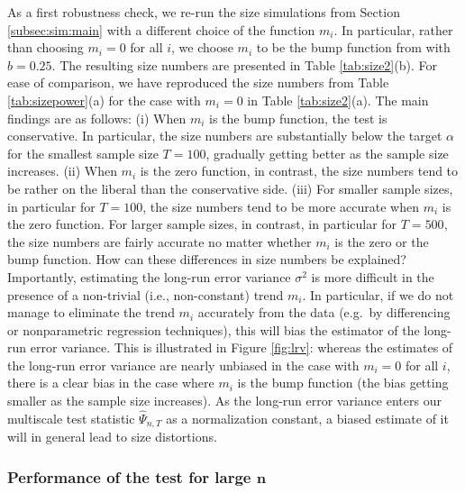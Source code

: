 \documentclass[12pt]{article}
\makeatletter
\renewcommand{\eqref}[1]{\tagform@{\ref{#1}}}
\makeatother
\begin{document}
As a first robustness check, we re-run the size simulations from Section \ref{subsec:sim:main}  with a different choice of the function $m_i$. In particular, rather than choosing $m_i = 0$ for all $i$, we choose $m_i$ to be the bump function from \eqref{eq:bump-fct} with $b=0.25$. The resulting size numbers are presented in Table \ref{tab:size2}(b). For ease of comparison, we have reproduced the size numbers from Table \ref{tab:sizepower}(a) for the case with $m_i=0$ in Table \ref{tab:size2}(a). The main findings are as follows: (i) When $m_i$ is the bump function, the test is conservative. In particular, the size numbers are substantially below the target $\alpha$ for the smallest sample size $T=100$, gradually getting better as the sample size increases. (ii) When $m_i$ is the zero function, in contrast, the size numbers tend to be rather on the liberal than the conservative side. (iii) For smaller sample sizes, in particular for $T=100$, the size numbers tend to be more accurate when $m_i$ is the zero function. For larger sample sizes, in contrast, in particular for $T=500$, the size numbers are fairly accurate no matter whether $m_i$ is the zero or the bump function. 
How can these differences in size numbers be explained? Importantly, estimating the long-run error variance $\sigma^2$ is more difficult in the presence of a non-trivial (i.e., non-constant) trend $m_i$. In particular, if we do not manage to eliminate the trend $m_i$ accurately from the data (e.g.\ by differencing or nonparametric regression techniques), this will bias the estimator of the long-run error variance. This is illustrated in Figure \ref{fig:lrv}: whereas the estimates of the long-run error variance are nearly unbiased in the case with $m_i = 0$ for all $i$, there is a clear bias in the case where $m_i$ is the bump function (the bias getting smaller as the sample size increases). As the long-run error variance enters our multiscale test statistic $\widehat{\Psi}_{n,T}$ as a normalization constant, a biased estimate of it will in general lead to size distortions. 


\subsubsection{Performance of the test for large $\boldsymbol{n}$}\label{subsec:sim:large_n}
\end{document}
